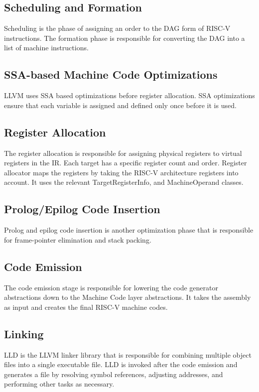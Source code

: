 \subsection{Scheduling and Formation}
Scheduling is the phase of assigning an order to the DAG form of RISC-V instructions. The formation phase is responsible for converting the DAG into a list of machine instructions.  

\subsection{SSA-based Machine Code Optimizations}
LLVM uses SSA based optimizations before register allocation. SSA optimizations ensure that each variable is assigned and defined only once before it is used. 


\subsection{Register Allocation}
The register allocation is responsible for assigning physical registers to virtual registers in the IR. Each target has a specific register count and order. Register allocator maps the registers by taking the RISC-V architecture registers into account. It uses the relevant TargetRegisterInfo, and MachineOperand classes. 

\subsection{Prolog/Epilog Code Insertion}
Prolog and epilog code insertion is another optimization phase that is responsible for frame-pointer elimination and stack packing.


\pagebreak
\subsection{Code Emission}
The code emission stage is responsible for lowering the code generator abstractions down to the Machine Code layer abstractions. It takes the assembly as input and creates the final RISC-V machine codes. 

\subsection{Linking}
LLD is the LLVM linker library that is responsible for combining multiple object files into a single executable file. LLD is invoked after the code emission and generates a file by resolving symbol references, adjusting addresses, and performing other tasks as necessary.
